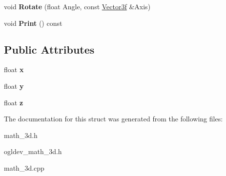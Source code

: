 \begin{DoxyCompactItemize}
\item 
\hypertarget{structVector3f_aa38c378d40f62c1430271571093674ac}{void {\bfseries Rotate} (float Angle, const \hyperlink{structVector3f}{Vector3f} \&Axis)}\label{structVector3f_aa38c378d40f62c1430271571093674ac}

\item 
\hypertarget{structVector3f_a62c1600e55fde7646bebbbcb2cca2fe3}{void {\bfseries Print} () const }\label{structVector3f_a62c1600e55fde7646bebbbcb2cca2fe3}

\end{DoxyCompactItemize}
\subsection*{Public Attributes}
\begin{DoxyCompactItemize}
\item 
\hypertarget{structVector3f_a4aca0751716b7099b397e8c63b16bfcf}{float {\bfseries x}}\label{structVector3f_a4aca0751716b7099b397e8c63b16bfcf}

\item 
\hypertarget{structVector3f_a8a602e2ee75126feb520c2aa27e7eff5}{float {\bfseries y}}\label{structVector3f_a8a602e2ee75126feb520c2aa27e7eff5}

\item 
\hypertarget{structVector3f_a470cff51eb6463672be518f5af4e26db}{float {\bfseries z}}\label{structVector3f_a470cff51eb6463672be518f5af4e26db}

\end{DoxyCompactItemize}


The documentation for this struct was generated from the following files\-:\begin{DoxyCompactItemize}
\item 
math\-\_\-3d.\-h\item 
ogldev\-\_\-math\-\_\-3d.\-h\item 
math\-\_\-3d.\-cpp\end{DoxyCompactItemize}
